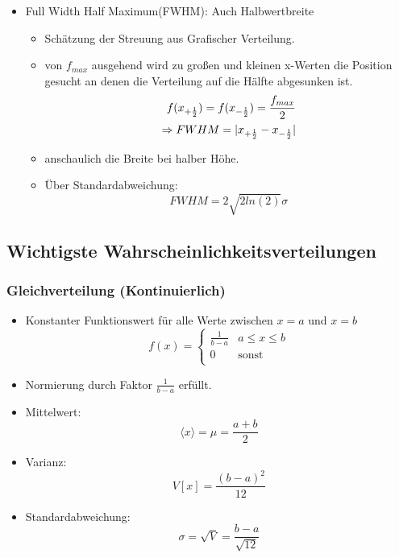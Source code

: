 \documentclass[10pt,a4paper]{article}
\begin{document}
\begin{itemize}
\newpage
\item Full Width Half Maximum(FWHM): Auch Halbwertbreite
\begin{itemize}
\item Schätzung der Streuung aus Grafischer Verteilung.
\item von $f_{max}$ ausgehend wird zu großen und kleinen x-Werten die Position gesucht an denen die Verteilung auf die Hälfte abgesunken ist.
\begin{align}
f(x_{+\frac{1}{2}})=f(x_{-\frac{1}{2}})=\frac{f_{max}}{2} \notag \\
\Rightarrow FWHM=|x_{+\frac{1}{2}}-x_{-\frac{1}{2}}|
\end{align}
\item anschaulich die Breite bei halber Höhe.
\item Über Standardabweichung:
\begin{equation}
FWHM=2\sqrt{2ln(2)}\sigma
\end{equation}
\end{itemize} 
\end{itemize}

\newpage
\subsection{Wichtigste Wahrscheinlichkeitsverteilungen}
\subsubsection{Gleichverteilung (Kontinuierlich)}
\begin{itemize}
\item Konstanter Funktionswert für alle Werte zwischen $x=a$ und $x=b$
	\begin{equation}
		f(x) =
   			\begin{cases}
     			\frac{1}{b-a} & a\le x \le b \\
     			0 & \text{sonst}\\
   			\end{cases}
	\end{equation}
\item Normierung durch Faktor $\frac{1}{b-a}$ erfüllt.
\item Mittelwert:
	\begin{equation}
		\langle x \rangle = \mu = \frac{a+b}{2}
	\end{equation} 
\item Varianz:
	\begin{equation}
		V[x]=\frac{(b-a)^2}{12}
	\end{equation}
\item Standardabweichung:
	\begin{equation}
		\sigma = \sqrt{V}=\frac{b-a}{\sqrt{12}}
	\end{equation}
\end{itemize}
\end{document}
